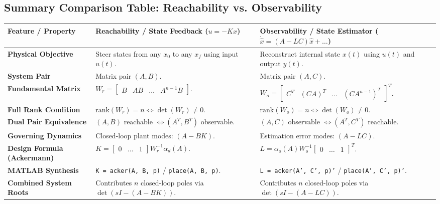 \documentclass[12pt,onecolumn,twoside ]{article}
\begin{document}
	\subsection{Summary Comparison Table: Reachability vs. Observability}
	\begin{center}\small\begin{tabularx}{\textwidth}{*{3}{Y}}
			\toprule
			\textbf{Feature / Property} & \textbf{Reachability / State Feedback ($u = -Kx$)} & \textbf{Observability / State Estimator ($\dot{\hat{x}} = (A-LC)\hat{x} + \dots$)} \\
			\midrule
			\textbf{Physical Objective} & Steer states from any $x_0$ to any $x_f$ using input $u(t)$. & Reconstruct internal state $x(t)$ using $u(t)$ and output $y(t)$. \\
			\textbf{System Pair} & Matrix pair $(A, B)$. & Matrix pair $(A, C)$. \\
			\textbf{Fundamental Matrix} & $W_r = \begin{bmatrix} B & AB & \dots & A^{n-1}B \end{bmatrix}$. & $W_o = \begin{bmatrix} C^T & (CA)^T & \dots & (CA^{n-1})^T \end{bmatrix}^T$. \\
			\textbf{Full Rank Condition} & $\text{rank}(W_r) = n \iff \det(W_r) \neq 0$. & $\text{rank}(W_o) = n \iff \det(W_o) \neq 0$. \\
			\textbf{Dual Pair Equivalence} & $(A, B)$ reachable $\iff (A^T, B^T)$ observable. & $(A, C)$ observable $\iff (A^T, C^T)$ reachable. \\
			\textbf{Governing Dynamics} & Closed-loop plant modes: $(A - BK)$. & Estimation error modes: $(A - LC)$. \\
			\textbf{Design Formula (Ackermann)} & $K = \begin{bmatrix} 0 & \dots & 1 \end{bmatrix} W_r^{-1} \alpha_d(A)$. & $L = \alpha_o(A) W_o^{-1} \begin{bmatrix} 0 & \dots & 1 \end{bmatrix}^T$. \\
			\textbf{MATLAB Synthesis} & \texttt{K = acker(A, B, p)} / \texttt{place(A, B, p)}. & \texttt{L = acker(A', C', p)'} / \texttt{place(A', C', p)'}. \\
			\textbf{Combined System Roots} & Contributes $n$ closed-loop poles via $\det(sI - (A - BK))$. & Contributes $n$ closed-loop poles via $\det(sI - (A - LC))$. \\
			\bottomrule
	\end{tabularx}\end{center}
	
\end{document}
